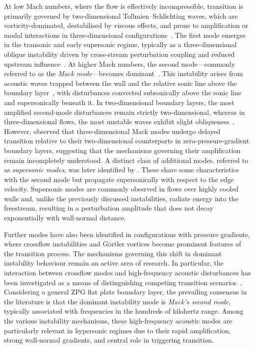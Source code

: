 At low Mach numbers, where the flow is effectively incompressible, transition is primarily governed by two-dimensional Tollmien--Schlichting waves, which are vorticity-dominated, destabilised by viscous effects, and prone to amplification or modal interactions in three-dimensional configurations~\citep{Schubauer1948}. The first mode emerges in the transonic and early supersonic regime, typically as a three-dimensional oblique instability driven by cross-stream perturbation coupling and reduced upstream influence~\citep{Mack1984,Reed1996}. At higher Mach numbers, the second mode—commonly referred to as the \textit{Mack mode}—becomes dominant~\citep{Kuehl2018}. This instability arises from acoustic waves trapped between the wall and the relative sonic line above the boundary layer~\citep{Bitter2015}, with disturbances convected subsonically above the sonic line and supersonically beneath it. In two-dimensional boundary layers, the most amplified second-mode disturbances remain strictly two-dimensional, whereas in three-dimensional flows, the most unstable waves exhibit slight obliqueness~\citep{Balakumar1991}. However, \citet{Franko2013} observed that three-dimensional Mack modes undergo delayed transition relative to their two-dimensional counterparts in zero-pressure-gradient boundary layers, suggesting that the mechanisms governing their amplification remain incompletely understood. A distinct class of additional modes, referred to as \textit{supersonic modes}, was later identified by \citet{Mack1987}. These share some characteristics with the second mode but propagate supersonically with respect to the edge velocity. Supersonic modes are commonly observed in flows over highly cooled walls and, unlike the previously discussed instabilities, radiate energy into the freestream, resulting in a perturbation amplitude that does not decay exponentially with wall-normal distance.

Further  modes have also been identified in configurations with pressure gradients, where crossflow instabilities and Görtler vortices become prominent features of the transition process. The mechanisms governing this shift in dominant instability behaviour remain an active area of research. In particular, the interaction between crossflow modes and high-frequency acoustic disturbances has been investigated as a means of distinguishing competing transition scenarios~\citep{Dong2020}. Considering a general \gls{ZPG} flat plate boundary layer, the prevailing consensus in the literature is that the dominant instability mode is \textit{Mack's second mode}, typically associated with frequencies in the hundreds of kilohertz range. Among the various instability mechanisms, these high-frequency acoustic modes are particularly relevant in hypersonic regimes due to their rapid amplification, strong wall-normal gradients, and central role in triggering transition.


